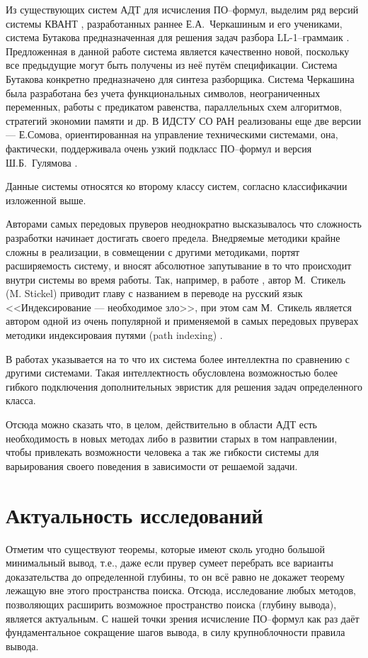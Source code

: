 
Из существующих систем АДТ для исчисления ПО--формул, выделим ряд версий системы КВАНТ \cite{dissChe, Che2, QUANT4}, разработанных раннее Е.А.~Черкашиным и его учениками, система Бутакова предназначенная для решения задач разбора LL-1--граммаик \cite{Butakov1}. Предложенная в данной работе система является качественно новой, поскольку все предыдущие могут быть получены из неё путём спецификации. Система Бутакова конкретно предназначено для синтеза разборщика. Система Черкашина была разработана без учета функциональных символов, неограниченных переменных, работы с предикатом равенства, параллельных схем алгоритмов, стратегий экономии памяти и др. В ИДСТУ СО РАН реализованы еще две версии --- Е.Сомова, ориентированная на управление техническими системами, она, фактически, поддерживала очень узкий подкласс ПО--формул и версия Ш.Б.~Гулямова \cite{Gulamov}.

Данные системы относятся ко второму классу систем, согласно классификачии изложенной выше.

Авторами самых передовых пруверов неоднократно высказывалось что сложность разработки начинает достигать своего предела. Внедряемые методики крайне сложны в реализации, в совмещении с другими методиками, портят расширяемость систему, и вносят абсолютное запутывание в то что происходит внутри системы во время работы. Так, например, в работе \cite{BTPstickel}, автор М.~Стикель (M. Stickel) приводит главу с названием в переводе на русский язык <<Индексирование --- необходимое зло>>, при этом сам М.~Стикель является автором одной из очень популярной и применяемой в самых передовых пруверах методики индексироваия путями (path indexing) \cite{pathindex}.

В работах \cite{Eprover} указывается на то что их система более интеллектна по сравнению с другими системами. Такая интеллектность обусловлена возможностью более гибкого подключения дополнительных эвристик для решения задач определенного класса.

Отсюда можно сказать что, в целом, действительно в области АДТ есть необходимость в новых методах либо в развитии старых в том направлении, чтобы привлекать возможности человека а так же гибкости системы для варьирования своего поведения в зависимости от решаемой задачи.


\section{Актуальность исследований}
Отметим что существуют теоремы, которые имеют сколь угодно большой минимальный вывод, т.е., даже если прувер сумеет перебрать все варианты доказательства до определенной глубины, то он всё равно не докажет теорему лежащую вне этого пространства поиска. Отсюда, исследование любых методов, позволяющих расширить возможное пространство поиска (глубину вывода), является актуальным. С нашей точки зрения исчисление ПО--формул как раз даёт фундаментальное сокращение шагов вывода, в силу крупноблочности правила вывода.

